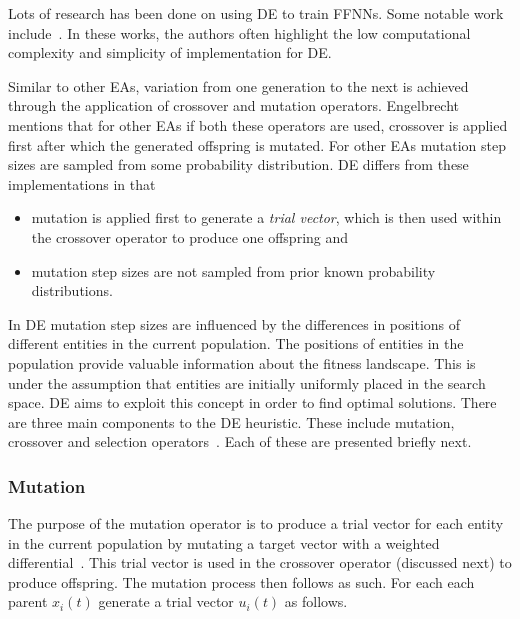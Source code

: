 Lots of research has been done on using \acs{DE} to train \acp{FFNN}. Some notable work include~\cite{ref:ilonen:2003}\cite{ref:slowik:2008}\cite{ref:mingguang:2009}. In these works, the authors often highlight the low computational complexity and simplicity of implementation for \acs{DE}.

Similar to other \acp{EA}, variation from one generation to the next is achieved through the application of crossover and mutation operators. Engelbrecht~\cite{ref:engelbrecht:2007} mentions that for other \acp{EA} if both these operators are used, crossover is applied first after which the generated offspring is mutated. For other \acp{EA} mutation step sizes are sampled from some probability distribution. \acs{DE} differs from these implementations in that

\begin{itemize}
      \item mutation is applied first to generate a \textit{trial vector}, which is then used within the crossover operator to produce one offspring and
      \item mutation step sizes are not sampled from prior known probability distributions.
\end{itemize}

In \acs{DE} mutation step sizes are influenced by the differences in positions of different entities in the current population. The positions of entities in the population provide valuable information about the fitness landscape. This is under the assumption that entities are initially uniformly placed in the search space. \acs{DE} aims to exploit this concept in order to find optimal solutions. There are three main components to the \acs{DE} heuristic. These include mutation, crossover and selection operators~\cite{ref:price:2006}. Each of these are presented briefly next.

\subsubsection{Mutation}
\label{sec:heuristics:mh:de:mutation}

The purpose of the mutation operator is to produce a trial vector for each entity in the current population by mutating a target vector with a weighted differential~\cite{ref:engelbrecht:2007}. This trial vector is used in the crossover operator (discussed next) to produce offspring. The mutation process then follows as such. For each each parent $x_{i}(t)$ generate a trial vector $u_{i}(t)$ as follows.

